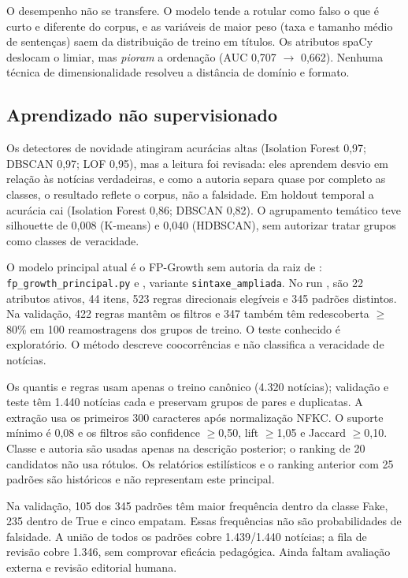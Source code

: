 \documentclass[brazilian,11pt,a4paper]{article}
\begin{document}
O desempenho não se transfere. O modelo tende a rotular como falso o que é curto e diferente do corpus, e as variáveis de maior peso (taxa e tamanho médio de sentenças) saem da distribuição de treino em títulos. Os atributos spaCy deslocam o limiar, mas \emph{pioram} a ordenação (AUC 0,707 $\to$ 0,662). Nenhuma técnica de dimensionalidade resolveu a distância de domínio e formato.

\subsection{Aprendizado não supervisionado}

Os detectores de novidade atingiram acurácias altas (Isolation Forest 0,97; DBSCAN 0,97; LOF 0,95), mas a leitura foi revisada: eles aprendem desvio em relação às notícias verdadeiras, e como a autoria separa quase por completo as classes, o resultado reflete o corpus, não a falsidade. Em holdout temporal a acurácia cai (Isolation Forest 0,86; DBSCAN 0,82). O agrupamento temático teve silhouette de 0,008 (K-means) e 0,040 (HDBSCAN), sem autorizar tratar grupos como classes de veracidade.

O modelo principal atual é o FP-Growth sem autoria da raiz de : \texttt{fp\_growth\_principal.py} e , variante \texttt{sintaxe\_ampliada}. No run , são 22 atributos ativos, 44 itens, 523 regras direcionais elegíveis e 345 padrões distintos. Na validação, 422 regras mantêm os filtros e 347 também têm redescoberta $\geq$80\% em 100 reamostragens dos grupos de treino. O teste conhecido é exploratório. O método descreve coocorrências e não classifica a veracidade de notícias.

Os quantis e regras usam apenas o treino canônico (4.320 notícias); validação e teste têm 1.440 notícias cada e preservam grupos de pares e duplicatas. A extração usa os primeiros 300 caracteres após normalização NFKC. O suporte mínimo é 0,08 e os filtros são confidence $\geq$0,50, lift $\geq$1,05 e Jaccard $\geq$0,10. Classe e autoria são usadas apenas na descrição posterior; o ranking de 20 candidatos não usa rótulos. Os relatórios estilísticos e o ranking anterior com 25 padrões são históricos e não representam este principal.

Na validação, 105 dos 345 padrões têm maior frequência dentro da classe Fake, 235 dentro de True e cinco empatam. Essas frequências não são probabilidades de falsidade. A união de todos os padrões cobre 1.439/1.440 notícias; a fila de revisão cobre 1.346, sem comprovar eficácia pedagógica. Ainda faltam avaliação externa e revisão editorial humana.
\end{document}
